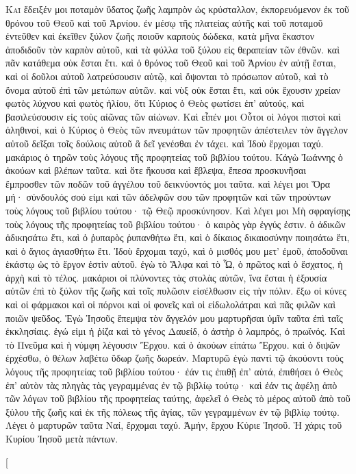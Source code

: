 \begin{pages}
    \begin{Rightside}
        \beginnumbering
		\renewcommand{\LettrineFontHook}{\PHtitl}
		\lettrine[lines=3]{Κ}{αὶ} ἔδειξέν μοι ποταμὸν ὕδατος ζωῆς λαμπρὸν ὡς κρύσταλλον, ἐκπορευόμενον ἐκ τοῦ θρόνου τοῦ Θεοῦ καὶ τοῦ Ἀρνίου. ἐν μέσῳ τῆς πλατείας αὐτῆς καὶ τοῦ ποταμοῦ ἐντεῦθεν καὶ ἐκεῖθεν ξύλον ζωῆς ποιοῦν καρποὺς δώδεκα, κατὰ μῆνα ἕκαστον ἀποδιδοῦν τὸν καρπὸν αὐτοῦ, καὶ τὰ φύλλα τοῦ ξύλου εἰς θεραπείαν τῶν ἐθνῶν. 
		\pend
		\pstart
		καὶ πᾶν κατάθεμα οὐκ ἔσται ἔτι. καὶ ὁ θρόνος τοῦ Θεοῦ καὶ τοῦ Ἀρνίου ἐν αὐτῇ ἔσται, καὶ οἱ δοῦλοι αὐτοῦ λατρεύσουσιν αὐτῷ, καὶ ὄψονται τὸ πρόσωπον αὐτοῦ, καὶ τὸ ὄνομα αὐτοῦ ἐπὶ τῶν μετώπων αὐτῶν. καὶ νὺξ οὐκ ἔσται ἔτι, καὶ οὐκ ἔχουσιν χρείαν φωτὸς λύχνου καὶ φωτὸς ἡλίου, ὅτι Κύριος ὁ Θεὸς φωτίσει ἐπ’ αὐτούς, καὶ βασιλεύσουσιν εἰς τοὺς αἰῶνας τῶν αἰώνων.
		\pend
		\pstart
		Καὶ εἶπέν μοι Οὗτοι οἱ λόγοι πιστοὶ καὶ ἀληθινοί, καὶ ὁ Κύριος ὁ Θεὸς τῶν πνευμάτων τῶν προφητῶν ἀπέστειλεν τὸν ἄγγελον αὐτοῦ δεῖξαι τοῖς δούλοις αὐτοῦ ἃ δεῖ γενέσθαι ἐν τάχει. καὶ Ἰδοὺ ἔρχομαι ταχύ. μακάριος ὁ τηρῶν τοὺς λόγους τῆς προφητείας τοῦ βιβλίου τούτου. Κἀγὼ Ἰωάννης ὁ ἀκούων καὶ βλέπων ταῦτα. καὶ ὅτε ἤκουσα καὶ ἔβλεψα, ἔπεσα προσκυνῆσαι ἔμπροσθεν τῶν ποδῶν τοῦ ἀγγέλου τοῦ δεικνύοντός μοι ταῦτα. καὶ λέγει μοι Ὅρα μή· σύνδουλός σού εἰμι καὶ τῶν ἀδελφῶν σου τῶν προφητῶν καὶ τῶν τηρούντων τοὺς λόγους τοῦ βιβλίου τούτου· τῷ Θεῷ προσκύνησον. 
		\pend
		\pstart
		Καὶ λέγει μοι Μὴ σφραγίσῃς τοὺς λόγους τῆς προφητείας τοῦ βιβλίου τούτου· ὁ καιρὸς γὰρ ἐγγύς ἐστιν. ὁ ἀδικῶν ἀδικησάτω ἔτι, καὶ ὁ ῥυπαρὸς ῥυπανθήτω ἔτι, καὶ ὁ δίκαιος δικαιοσύνην ποιησάτω ἔτι, καὶ ὁ ἅγιος ἁγιασθήτω ἔτι. Ἰδοὺ ἔρχομαι ταχύ, καὶ ὁ μισθός μου μετ’ ἐμοῦ, ἀποδοῦναι ἑκάστῳ ὡς τὸ ἔργον ἐστὶν αὐτοῦ. ἐγὼ τὸ Ἄλφα καὶ τὸ Ὦ, ὁ πρῶτος καὶ ὁ ἔσχατος, ἡ ἀρχὴ καὶ τὸ τέλος. μακάριοι οἱ πλύνοντες τὰς στολὰς αὐτῶν, ἵνα ἔσται ἡ ἐξουσία αὐτῶν ἐπὶ τὸ ξύλον τῆς ζωῆς καὶ τοῖς πυλῶσιν εἰσέλθωσιν εἰς τὴν πόλιν. ἔξω οἱ κύνες καὶ οἱ φάρμακοι καὶ οἱ πόρνοι καὶ οἱ φονεῖς καὶ οἱ εἰδωλολάτραι καὶ πᾶς φιλῶν καὶ ποιῶν ψεῦδος.
		\pend
		\pstart
		Ἐγὼ Ἰησοῦς ἔπεμψα τὸν ἄγγελόν μου μαρτυρῆσαι ὑμῖν ταῦτα ἐπὶ ταῖς ἐκκλησίαις. ἐγώ εἰμι ἡ ῥίζα καὶ τὸ γένος Δαυείδ, ὁ ἀστὴρ ὁ λαμπρός, ὁ πρωϊνός. Καὶ τὸ Πνεῦμα καὶ ἡ νύμφη λέγουσιν Ἔρχου. καὶ ὁ ἀκούων εἰπάτω Ἔρχου. καὶ ὁ διψῶν ἐρχέσθω, ὁ θέλων λαβέτω ὕδωρ ζωῆς δωρεάν.
		\pend
		\pstart
		Μαρτυρῶ ἐγὼ παντὶ τῷ ἀκούοντι τοὺς λόγους τῆς προφητείας τοῦ βιβλίου τούτου· ἐάν τις ἐπιθῇ ἐπ’ αὐτά, ἐπιθήσει ὁ Θεὸς ἐπ’ αὐτὸν τὰς πληγὰς τὰς γεγραμμένας ἐν τῷ βιβλίῳ τούτῳ· καὶ ἐάν τις ἀφέλῃ ἀπὸ τῶν λόγων τοῦ βιβλίου τῆς προφητείας ταύτης, ἀφελεῖ ὁ Θεὸς τὸ μέρος αὐτοῦ ἀπὸ τοῦ ξύλου τῆς ζωῆς καὶ ἐκ τῆς πόλεως τῆς ἁγίας, τῶν γεγραμμένων ἐν τῷ βιβλίῳ τούτῳ. Λέγει ὁ μαρτυρῶν ταῦτα Ναί, ἔρχομαι ταχύ. Ἀμήν, ἔρχου Κύριε Ἰησοῦ.
		\pend
		\pstart
		Ἡ χάρις τοῦ Κυρίου Ἰησοῦ μετὰ πάντων.	
		\pend
        \endnumbering
    \end{Rightside}
    \begin{Leftside}
        \beginnumbering
        \pstart[

\end{Leftside}
\end{pages}
